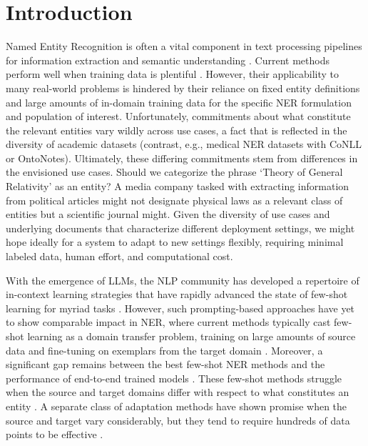\documentclass[11pt]{article}
\begin{document}
\section{Introduction}
Named Entity Recognition \citep{chinchor1995muc} is often a vital component 
in text processing pipelines for information extraction and semantic understanding
\citep{sharma2022named, ali2022named}. 
Current methods perform well when training data is plentiful
\citep{wang2022deepstruct, yu2020named, li2022unified, wang2020automated}.
However, their applicability to many real-world problems
is hindered by their reliance on fixed entity definitions
and large amounts of in-domain training data
for the specific NER formulation and population of interest.
Unfortunately, commitments about what constitute the relevant entities
vary wildly across use cases, a fact that is reflected
in the diversity of academic datasets
(contrast, e.g., medical NER datasets with CoNLL or OntoNotes). 
Ultimately, these differing commitments 
stem from differences in the envisioned use cases.
Should we categorize the phrase `Theory of General Relativity' as an entity? 
A media company tasked with extracting 
information from political articles
might not designate physical laws
as a relevant class of entities
but a scientific journal might. 
Given the diversity of use cases 
and underlying documents
that characterize different deployment settings,
we might hope ideally for a system to adapt to new settings flexibly,
requiring minimal labeled data, 
human effort, and computational cost. 


With the emergence of LLMs, the NLP community 
has developed a repertoire of in-context learning strategies 
that have rapidly advanced the state of few-shot learning
for myriad tasks \citep{brown2020language, wei2022chain, liu2023pre}.
However, such prompting-based approaches have yet 
to show comparable impact in NER, 
where current methods typically cast few-shot learning 
as a domain transfer problem, training on large amounts of source data 
and fine-tuning on exemplars from the target domain \citep{huang2022copner, yang2022factmix}.
Moreover, a significant gap remains between the best few-shot NER methods
and the performance of end-to-end trained models \citep{wang2022deepstruct, xu2022clozing}.
These few-shot methods struggle when the source and target domains 
differ with respect to what constitutes an entity \citep{yang2022factmix, das2022container}. 
A separate class of adaptation methods have shown promise 
when the source and target vary considerably, 
but they tend to require hundreds of data points to be effective
\citep{hu2022label, chen2023one, hu2022entda, chen2022prompt}. 
\end{document}
